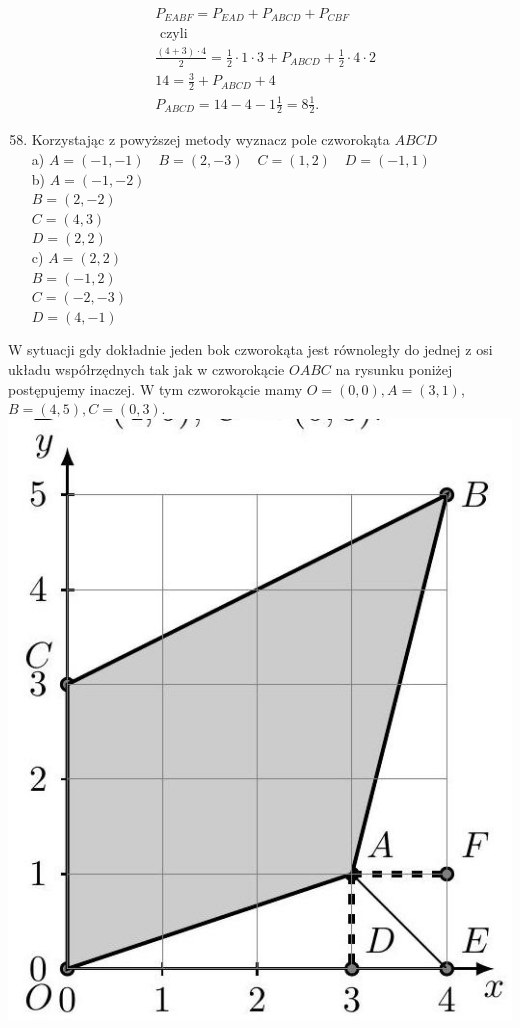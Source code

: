 \documentclass[10pt]{article}
\begin{document}
\[
\begin{aligned}
& P_{E A B F}=P_{E A D}+P_{A B C D}+P_{C B F} \\
& \text { czyli } \\
& \frac{(4+3) \cdot 4}{2}=\frac{1}{2} \cdot 1 \cdot 3+P_{A B C D}+\frac{1}{2} \cdot 4 \cdot 2 \\
& 14=\frac{3}{2}+P_{A B C D}+4 \\
& P_{A B C D}=14-4-1 \frac{1}{2}=8 \frac{1}{2} .
\end{aligned}
\]

\begin{enumerate}
  \setcounter{enumi}{57}
  \item Korzystając z powyższej metody wyznacz pole czworokąta \(A B C D\)\\
a) \(A=(-1,-1) \quad B=(2,-3) \quad C=(1,2) \quad D=(-1,1)\)\\
b) \(A=(-1,-2)\)\\
\(B=(2,-2)\)\\
\(C=(4,3)\)\\
\(D=(2,2)\)\\
c) \(A=(2,2)\)\\
\(B=(-1,2)\)\\
\(C=(-2,-3)\)\\
\(D=(4,-1)\)
\end{enumerate}

W sytuacji gdy dokładnie jeden bok czworokąta jest równoległy do jednej z osi układu współrzędnych tak jak w czworokącie \(O A B C\) na rysunku poniżej postępujemy inaczej. W tym czworokącie mamy \(O=(0,0), A=(3,1)\), \(B=(4,5), C=(0,3)\).\\
\includegraphics[max width=\textwidth, center]{2024_11_21_8f01584889ff06348ae7g-206}
\end{document}
